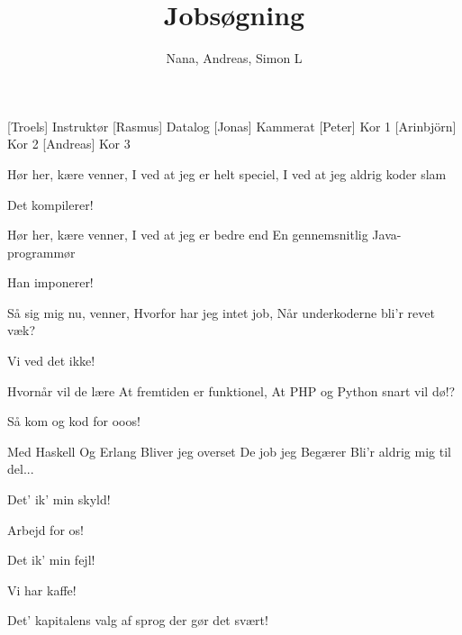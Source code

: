 \documentclass[a4paper,11pt]{article}
\title{Jobsøgning}
\author{Nana, Andreas, Simon L}
\begin{document}
\maketitle

\begin{roles}
[Troels] Instruktør
[Rasmus] Datalog
[Jonas] Kammerat
[Peter] Kor 1
[Arinbjörn] Kor 2
[Andreas] Kor 3
\end{roles}

\begin{song}


Hør her, kære venner,
I ved at jeg er helt speciel,
I ved at jeg aldrig koder slam

 Det kompilerer!

Hør her, kære venner,
I ved at jeg er bedre end
En gennemsnitlig Java-programmør

 Han imponerer!

Så sig mig nu, venner,
Hvorfor har jeg intet job,
Når underkoderne bli'r revet væk?

Vi ved det ikke!

Hvornår vil de lære
At fremtiden er funktionel, 
At PHP og Python snart vil dø!? 

Så kom og kod for ooos!

Med Haskell
Og Erlang
Bliver jeg overset
De job jeg
Begærer
Bli'r aldrig mig til del...

Det' ik' min skyld! 

Arbejd for os!

Det ik' min fejl!

Vi har kaffe!

Det' kapitalens valg af sprog
der gør det svært!



\end{song}
\end{document}
